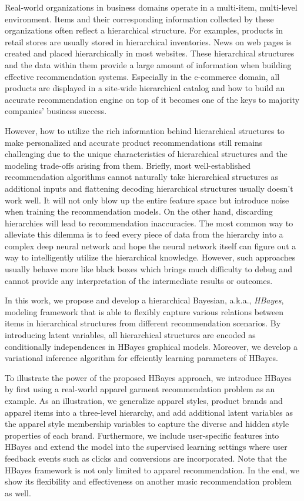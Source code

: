 Real-world organizations in business domains operate in a multi-item, multi-level environment. Items and their corresponding information collected by these organizations often reflect a hierarchical structure. For examples, products in retail stores are usually stored in hierarchical inventories. News on web pages is created and placed hierarchically in most websites. These hierarchical structures and the data within them provide a large amount of information when building effective recommendation systems. Especially in the e-commerce domain, all products are displayed in a site-wide hierarchical catalog and how to build an accurate recommendation engine on top of it becomes one of the keys to majority companies' business success. 

However, how to utilize the rich information behind hierarchical structures to make personalized and accurate product recommendations still remains challenging due to the unique characteristics of hierarchical structures and the modeling trade-offs arising from them. Briefly, most well-established recommendation algorithms cannot naturally take hierarchical structures as additional inputs and flattening decoding hierarchical structures usually doesn't work well. It will not only blow up the entire feature space but introduce noise when training the recommendation models. On the other hand, discarding hierarchies will lead to recommendation inaccuracies. The most common way to alleviate this dilemma is to feed every piece of data from the hierarchy into a complex deep neural network and hope the neural network itself can figure out a way to intelligently utilize the hierarchical knowledge. However, such approaches usually behave more like black boxes which brings much difficulty to debug and cannot provide any interpretation of the intermediate results or outcomes.

In this work, we propose and develop a hierarchical Bayesian, a.k.a., \emph{HBayes}, modeling framework that is able to flexibly capture various relations between items in hierarchical structures from different recommendation scenarios. By introducing latent variables, all hierarchical structures are encoded as conditionally independences in HBayes graphical models. Moreover, we develop a variational inference algorithm for effciently learning parameters of HBayes. 

To illustrate the power of the proposed HBayes approach, we introduce HBayes by first using a real-world apparel garment recommendation problem as an example. As an illustration, we generalize apparel styles, product brands and apparel items into a three-level hierarchy, and add additional latent variables as the apparel style membership variables to capture the diverse and hidden style properties of each brand.  Furthermore, we include user-specific features into HBayes and extend the model into the supervised learning settings where user feedback events such as clicks and conversions are incorporated.  Note that the HBayes framework is not only limited to apparel recommendation. In the end, we show its flexibility and effectiveness on another music recommendation problem as well.

